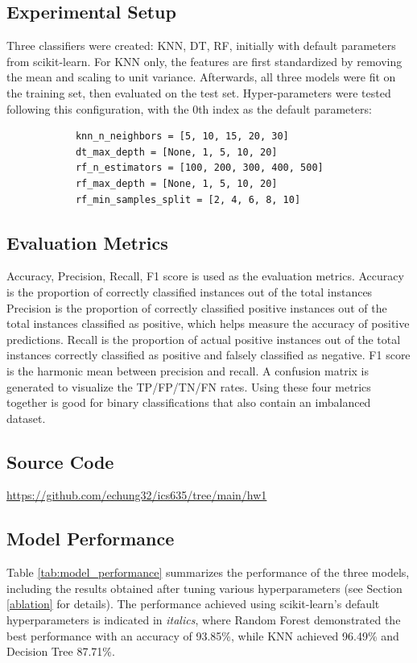 \documentclass[letterpaper]{article}
\begin{document}
	\subsection{Experimental Setup}
	
		Three classifiers were created: KNN, DT, RF, initially with default parameters from scikit-learn. For KNN only, the features are first standardized by removing the mean and scaling to unit variance. Afterwards, all three models were fit on the training set, then evaluated on the test set. Hyper-parameters were tested following this configuration, with the 0th index as the default parameters:
		
		\begin{verbatim}
			knn_n_neighbors = [5, 10, 15, 20, 30]
			dt_max_depth = [None, 1, 5, 10, 20]
			rf_n_estimators = [100, 200, 300, 400, 500]
			rf_max_depth = [None, 1, 5, 10, 20]
			rf_min_samples_split = [2, 4, 6, 8, 10]
		\end{verbatim}
	
	\subsection{Evaluation Metrics}
	
		Accuracy, Precision, Recall, F1 score is used as the evaluation metrics. Accuracy is the proportion of correctly classified instances out of the total instances  Precision is the proportion of correctly classified positive instances out of the total instances classified as positive, which helps measure the accuracy of positive predictions. Recall is the proportion of actual positive instances out of the total instances correctly classified as positive and falsely classified as negative. F1 score is the harmonic mean between precision and recall. A confusion matrix is generated to visualize the TP/FP/TN/FN rates. Using these four metrics together is good for binary classifications that also contain an imbalanced dataset.
		
	\subsection{Source Code}
		\url{https://github.com/echung32/ics635/tree/main/hw1}
	
	\subsection{Model Performance}
	
		Table \ref{tab:model_performance} summarizes the performance of the three models, including the results obtained after tuning various hyperparameters (see Section \ref{ablation} for details). The performance achieved using scikit-learn's default hyperparameters is indicated in \textit{italics}, where Random Forest demonstrated the best performance with an accuracy of 93.85\%, while KNN achieved 96.49\% and Decision Tree 87.71\%.
\end{document}
